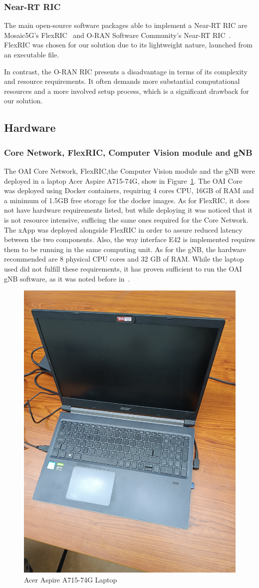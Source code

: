 \subsubsection{Near-RT RIC}
The main open-source software packages able to implement a Near-RT RIC are Mosaic5G’s FlexRIC~\cite{flexric} and  O-RAN Software Community’s Near-RT RIC~\cite{oran-sc}.
FlexRIC was chosen for our solution due to its lightweight nature, launched from an executable file.

In contrast, the O-RAN RIC presents a disadvantage in terms of its complexity and resource requirements.
It often demands more substantial computational resources and a more involved setup process, which is a significant drawback for our solution.

\subsection{Hardware}\label{subsec:hardware}


\subsubsection{Core Network, FlexRIC, Computer Vision module and gNB}
The OAI Core Network, FlexRIC,the Computer Vision module and the gNB were deployed in a laptop Acer Aspire A715-74G, show in Figure~\ref{fig:computer_acer}.
The OAI Core was deployed using Docker containers, requiring 4 cores CPU, 16GB of RAM and a minimum of 1.5GB free storage for the docker images.
As for FlexRIC, it does not have hardware requirements listed, but while deploying it was noticed that it is not resource intensive, sufficing the same ones required for the Core Network.
The xApp was deployed alongside FlexRIC in order to assure reduced latency between the two components.
Also,  the way interface E42 is implemented requires them to be running in the same computing unit.
As for the gNB, the hardware recommended are 8 physical CPU cores and 32 GB of RAM\@.
While the laptop used did not fulfill these requirements, it has proven sufficient to run the OAI gNB software, as it was noted before in~\cite{queiros2023autonomous}.

\begin{figure}[H]
    \centering
    \includegraphics[width=0.3\linewidth]{figures/acer}
    \caption{Acer Aspire A715-74G Laptop}
    \label{fig:computer_acer}
\end{figure}

